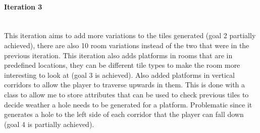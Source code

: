 \documentclass{article}
\newcommand{\parBr}{\vspace{5mm}}%
\newcommand{\myparagraph}[1]{\paragraph{#1}\mbox{}\\} %
\begin{document}
\myparagraph{Iteration 3}
This iteration aims to add more variations to the tiles generated (goal 2 partially achieved), there are also 10 room variations instead of the two that were in the previous iteration. This iteration also adds platforms in rooms that are in predefined locations, they can be different tile types to make the room more interesting to look at (goal 3 is achieved). Also added platforms in vertical corridors to allow the player to traverse upwards in them. This is done with a class to allow me to store attributes that can be used to check previous tiles to decide weather a hole needs to be generated for a platform. Problematic since it generates a hole to the left side of each corridor that the player can fall down (goal 4 is partially achieved).

\parBr
\end{document}
